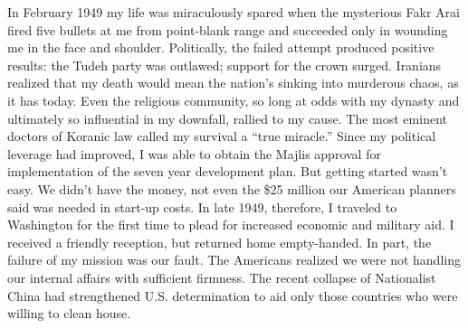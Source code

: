 In February 1949 my life was miraculously spared when the mysterious Fakr Arai fired five bullets at me from point-blank range and succeeded only in wounding me in the face and shoulder. Politically, the failed attempt produced positive results: the Tudeh party was outlawed; support for the crown surged. Iranians realized that my death would mean the nation’s sinking into murderous chaos, as it has today. Even the religious community, so long at odds with my dynasty and ultimately so influential in my downfall, rallied to my cause. The most eminent doctors of Koranic law called my survival a “true miracle.” Since my political leverage had improved, I was able to obtain the Majlis approval for implementation of the seven year development plan. But getting started wasn't easy. We didn’t have the money, not even the \$25 million our American planners said was needed in start-up costs. In late 1949, therefore, I traveled to Washington for the first time to plead for increased economic and military aid. I received a friendly reception, but returned home empty-handed. In part, the failure of my mission was our fault. The Americans realized we were not handling our internal affairs with sufficient firmness. The recent collapse of Nationalist China had strengthened U.S. determination to aid only those countries who were willing to clean house. 

